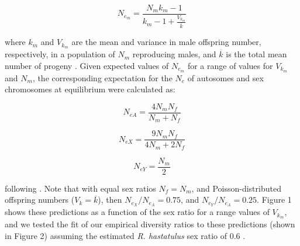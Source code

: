 \documentclass[9pt,twocolumn,twoside]{gsajnl}
\begin{document}
\begin{equation}
N_{e_{m}}=\frac{N_{m}k_{m}-1}{k_{m}-1+\frac{V_{k_{m}}}{\overline{k}}} \label{eq:Vk}
\end{equation}

where $k_{m}$ and $V_{k_{m}}$ are the mean and variance in male offspring number, respectively, in a population of $N_{m}$ reproducing males, and $\overline{k}$ is the total mean number of progeny \citep{kimura1964number}. Given expected values of $N_e_{m}$ for a range of values for $V_{k_{m}}$ and $N_{m}$, the corresponding expectation for the $N_{e}$ of autosomes and sex chromosomes at equilibrium were calculated as:

\begin{equation}
N_{e{A}} = \frac{4N_{m}N_{f}}{N_{m}+N_{f}} \label{eq:Ne}
\end{equation}

\begin{equation}
N_{e{X}} = \frac{9N_{m}N_{f}}{4N_{m}+2N_{f}} \label{eq:NeX}
\end{equation}

\begin{equation}
N_{e{Y}} = \frac{N_{m}}{2} \label{eq:NeY}
\end{equation}

following \citep{wright1931evolution}. Note that with equal sex ratios $N_{f} = N_{m}$, and Poisson-distributed offspring numbers ($V_{k} = \overline{k}$), then $N_{e_{X}}/N_{e_{A}} = 0.75$, and $N_{e_{Y}}/N_{e_{A}} = 0.25$. Figure 1 shows these predictions as a function of the sex ratio for a range values of $V_{k_{m}}$, and we tested the fit of our empirical diversity ratios to these predictions (shown in Figure 2) assuming the estimated \textit{R. hastatulus} sex ratio of 0.6 \citep{pickup2013influence}.
\end{document}
